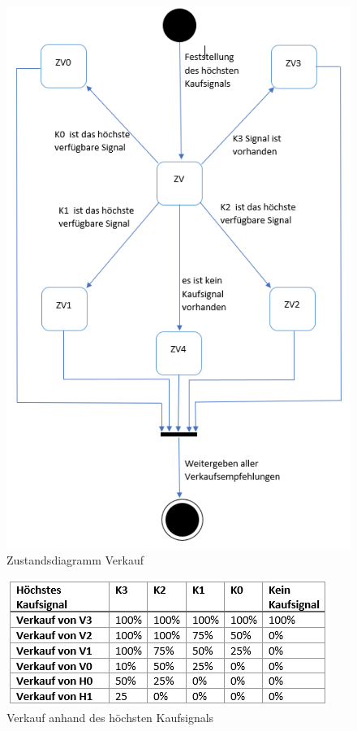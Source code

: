 \begin{figure}[h]
  \centering
  \includegraphics[width=\linewidth]{diagrammVerkauf}
  \caption{Zustandsdiagramm Verkauf}
  \label{diagrammV}
\end{figure}

\begin{figure}[h]
  \centering
  \includegraphics[width=\linewidth]{tabelleVerkauf}
  \caption{Verkauf anhand des höchsten Kaufsignals}
  \label{tabelleV}
\end{figure}

